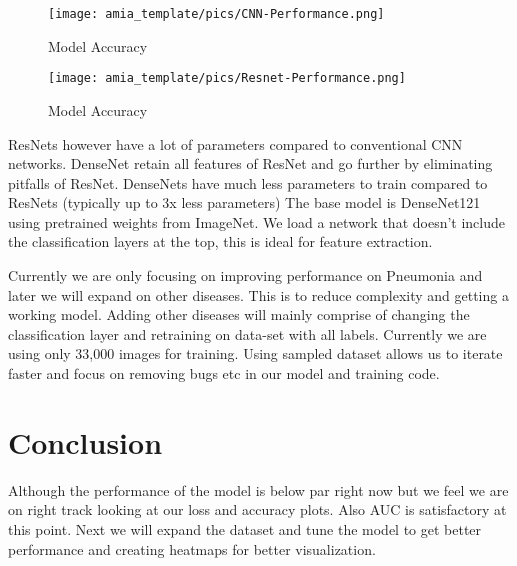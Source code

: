 \documentclass{amia}
\begin{document}
\begin{figure}[h!]
\centering
\texttt{[image: amia\_template/pics/CNN-Performance.png]}
\caption{Model Accuracy}
\label{fig2}
\end{figure}

\begin{figure}[h!]
\centering
\texttt{[image: amia\_template/pics/Resnet-Performance.png]}
\caption{Model Accuracy}
\label{fig2}
\end{figure}

ResNets however have a lot of parameters compared to conventional CNN networks. DenseNet retain all features of ResNet and go further by eliminating pitfalls of ResNet. DenseNets have much less parameters to train compared to ResNets (typically up to 3x less parameters)
The base model is DenseNet121 using pretrained weights from ImageNet. We load a network that doesn't include the classification layers at the top, this is ideal for feature extraction.

Currently we are only focusing on improving performance on Pneumonia and later we will expand on other diseases. This is to reduce complexity and getting a working model. Adding other diseases will mainly comprise of changing the classification layer and retraining on data-set with all labels. Currently we are using only 33,000  images for training. Using sampled dataset allows us to iterate faster and focus on removing bugs etc in our model and training code.
\section*{Conclusion}

Although the performance of the model is below par right now but we feel we are on right track looking at our loss and accuracy plots. Also AUC is satisfactory at this point. Next we will expand the dataset and tune the model to get better performance and creating heatmaps for better visualization.


\makeatletter
\renewcommand{\@biblabel}[1]{\hfill #1.}
\makeatother
\end{document}
